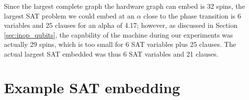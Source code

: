 Since the largest complete graph the hardware graph can embed is 32 spins, the largest SAT problem we could embed at an $\alpha$ close to the phase transition is 6 variables and 25 clauses for an alpha of 4.17; however, as discussed in Section \ref{sec:inop_qubits}, the capability of the \machine machine during our experiments was actually 29 spins, which is too small for 6 SAT variables plus 25 clauses.  The actual largest SAT embedded was thus 6 SAT variables and 21 clauses.

\section{Example SAT embedding}


